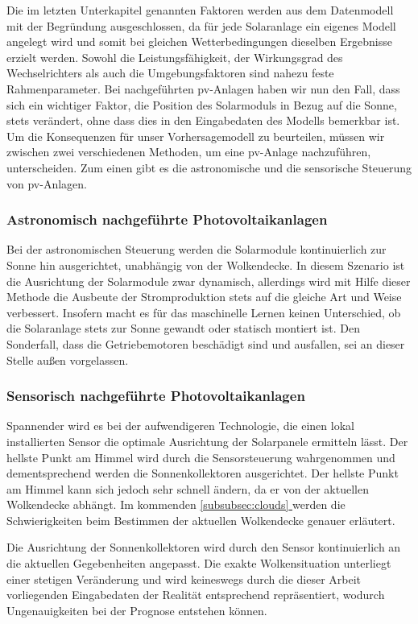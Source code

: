 \documentclass[12pt, a4paper]{article}
\newcommand*{\fullref}[1]{\hyperref[{#1}]{\autoref*{#1} \textit{\nameref*{#1}}}}
\begin{document}
Die im letzten Unterkapitel genannten Faktoren werden aus dem Datenmodell mit der Begründung ausgeschlossen, da für jede Solaranlage ein eigenes Modell angelegt wird und somit bei gleichen Wetterbedingungen dieselben Ergebnisse erzielt werden. 
Sowohl die Leistungsfähigkeit, der Wirkungsgrad des Wechselrichters als auch die Umgebungsfaktoren sind nahezu feste Rahmenparameter. Bei nachgeführten \ac{pv}-Anlagen haben wir nun den Fall, dass sich ein wichtiger Faktor, die Position des Solarmoduls in Bezug auf die Sonne, stets verändert, ohne dass dies in den Eingabedaten des Modells bemerkbar ist. Um die Konsequenzen für unser Vorhersagemodell zu beurteilen, müssen wir zwischen zwei verschiedenen Methoden, um eine \ac{pv}-Anlage nachzuführen, unterscheiden. Zum einen gibt es die astronomische und die sensorische Steuerung von \ac{pv}-Anlagen. 

\subsubsection{Astronomisch nachgeführte Photovoltaikanlagen}

Bei der astronomischen Steuerung werden die Solarmodule kontinuierlich zur Sonne hin ausgerichtet, unabhängig von der Wolkendecke. In diesem Szenario ist die Ausrichtung der Solarmodule zwar dynamisch, allerdings wird mit Hilfe dieser Methode die Ausbeute der Stromproduktion stets auf die gleiche Art und Weise verbessert. Insofern macht es für das maschinelle Lernen keinen Unterschied, ob die Solaranlage stets zur Sonne gewandt oder statisch montiert ist. Den Sonderfall, dass die Getriebemotoren beschädigt sind und ausfallen, sei an dieser Stelle außen vorgelassen.

\subsubsection{Sensorisch nachgeführte Photovoltaikanlagen}

Spannender wird es bei der aufwendigeren Technologie, die einen lokal installierten Sensor die optimale Ausrichtung der Solarpanele ermitteln lässt. Der hellste Punkt am Himmel wird durch die Sensorsteuerung wahrgenommen und dementsprechend werden die Sonnenkollektoren ausgerichtet. Der hellste Punkt am Himmel kann sich jedoch sehr schnell ändern, da er von der aktuellen Wolkendecke abhängt. Im kommenden \fullref{subsubsec:clouds} werden die Schwierigkeiten beim Bestimmen der aktuellen Wolkendecke genauer erläutert.

Die Ausrichtung der Sonnenkollektoren wird durch den Sensor kontinuierlich an die aktuellen Gegebenheiten angepasst. Die exakte Wolkensituation unterliegt einer stetigen Veränderung und wird keineswegs durch die dieser Arbeit vorliegenden Eingabedaten der Realität entsprechend repräsentiert, wodurch Ungenauigkeiten bei der Prognose entstehen können.
\end{document}
